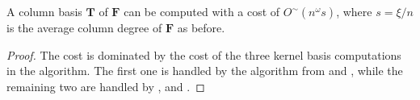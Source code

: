  
\begin{thm}
\label{thm:columnBasisCost1}A column basis $\mathbf{T}$ of $\mathbf{F}$
can be computed with a cost of $O^{\sim}\left(n^{\omega}s\right)$,
where $s=\xi/n$ is the average column degree of $\mathbf{F}$ as
before. \end{thm}
\begin{proof}
The cost is dominated by the cost of the three kernel basis computations
in the algorithm. The first one is handled by the algorithm from \cite{za2012}
and , while the remaining two are handled
by , 
and .\end{proof}

